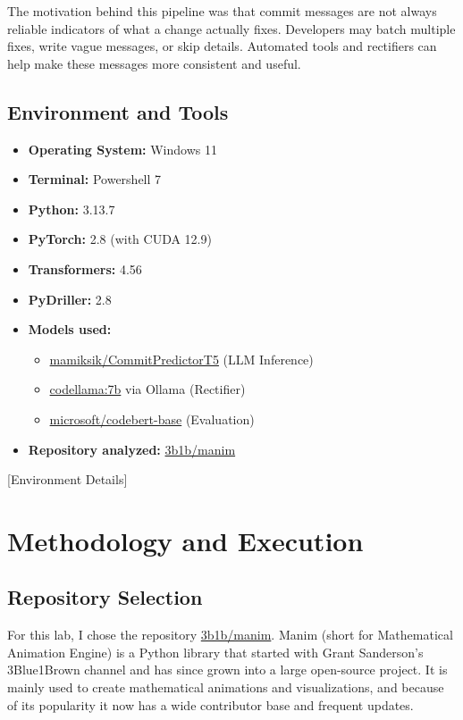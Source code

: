 \documentclass[10pt,a4paper]{report}
\begin{document}
The motivation behind this pipeline was that commit messages are not always reliable indicators of what a change actually fixes. Developers may batch multiple fixes, write vague messages, or skip details. Automated tools and rectifiers can help make these messages more consistent and useful.

\subsection{Environment and Tools}
\begin{itemize}[itemsep=0.05em, topsep=0pt]
    \item \textbf{Operating System:} Windows 11
    \item \textbf{Terminal:} Powershell 7
    \item \textbf{Python:} 3.13.7
    \item \textbf{PyTorch:} 2.8 (with CUDA 12.9)
    \item \textbf{Transformers:} 4.56
    \item \textbf{PyDriller:} 2.8
    \item \textbf{Models used:}
    \begin{itemize}[itemsep=0.05em, topsep=0pt]
        \item \href{https://huggingface.co/mamiksik/CommitPredictorT5}{mamiksik/CommitPredictorT5} (LLM Inference)
        \item \href{https://ollama.com/library/codellama}{codellama:7b} via Ollama (Rectifier)
        \item \href{https://huggingface.co/microsoft/codebert-base}{microsoft/codebert-base} (Evaluation)
    \end{itemize}
    \item \textbf{Repository analyzed:} \href{https://github.com/3b1b/manim}{3b1b/manim}
\end{itemize}

[Environment Details]

\section{Methodology and Execution}

\subsection{Repository Selection}
For this lab, I chose the repository \href{https://github.com/3b1b/manim}{3b1b/manim}. Manim (short for Mathematical Animation Engine) is a Python library that started with Grant Sanderson’s 3Blue1Brown channel and has since grown into a large open-source project. It is mainly used to create mathematical animations and visualizations, and because of its popularity it now has a wide contributor base and frequent updates.
\end{document}

